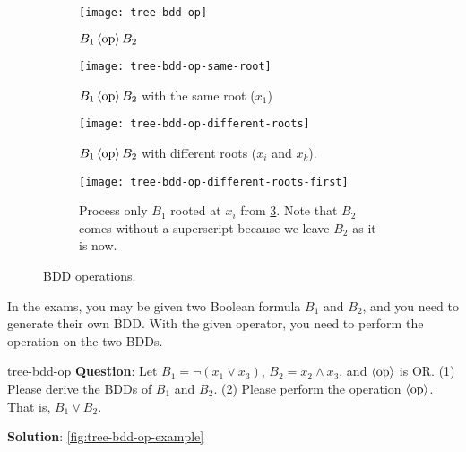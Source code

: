 \documentclass[../src/handouts/main.tex]{subfiles}
\begin{document}
\begin{figure}[htbp]
  \centering
  \begin{subfigure}[t]{.45\textwidth}
    \centering
    \texttt{[image: tree-bdd-op]}
    \caption{$B_1 \operatorname{\langle\text{op}\rangle} B_2$}
    \label{fig:tree-bdd-op}
  \end{subfigure}
  \hfill
  \begin{subfigure}[t]{.45\textwidth}
    \centering
    \texttt{[image: tree-bdd-op-same-root]}
    \caption{$B_1 \operatorname{\langle\text{op}\rangle} B_2$ with the same root ($x_1$)}
    \label{fig:tree-bdd-op-same-root}
  \end{subfigure}

  \begin{subfigure}[t]{.45\textwidth}
    \centering
    \texttt{[image: tree-bdd-op-different-roots]}
    \caption{$B_1 \operatorname{\langle\text{op}\rangle} B_2$ with different roots ($x_i$ and $x_k$).}
    \label{fig:tree-bdd-op-different-roots}
  \end{subfigure}
  \hfill
  \begin{subfigure}[t]{.5\textwidth}
    \centering
    \texttt{[image: tree-bdd-op-different-roots-first]}
    \caption{Process only $B_1$ rooted at $x_i$ from \cref{fig:tree-bdd-op-different-roots}. Note that $B_2$ comes without a superscript because we leave $B_2$ as it is now.}
    \label{fig:tree-bdd-op-different-roots-first}
  \end{subfigure}
  \caption{BDD operations.}
  \label{fig:tree-bdd-op-figures}
\end{figure}

In the exams, you may be given two Boolean formula $B_1$ and $B_2$, and you need to generate their own BDD. With the given operator, you need to perform the operation on the two BDDs.

\begin{example}{}{tree-bdd-op}
  \textbf{Question}: Let $B_1 = \neg \left( x_1 \lor x_3 \right)$, $B_2 = x_2 \land x_3$, and $\operatorname{\langle\text{op}\rangle}$ is OR. (1) Please derive the BDDs of $B_1$ and $B_2$. (2) Please perform the operation $\operatorname{\langle\text{op}\rangle}$. That is, $B_1 \lor B_2$.

  \textbf{Solution}: \cref{fig:tree-bdd-op-example}
\end{example}
\end{document}
